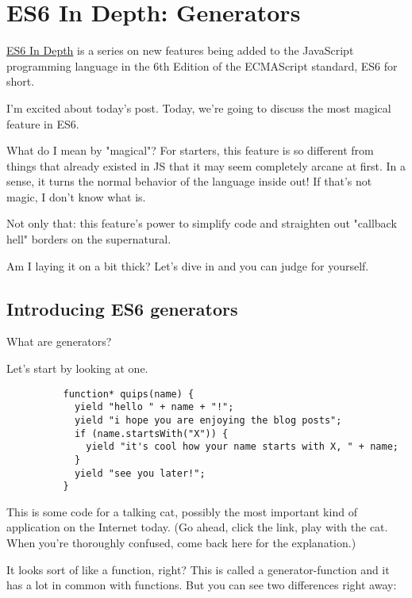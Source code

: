 
\thesistranslationoriginal
\section{ES6 In Depth: Generators}
  \label{sec:es6_in_depth_generators}
    \href{https://hacks.mozilla.org/category/es6-in-depth/}{ES6 In Depth} is a series on new features being added to the JavaScript programming language in the 6th Edition of the ECMAScript standard, ES6 for short.

    I'm excited about today's post. Today, we're going to discuss the most magical feature in ES6.

    What do I mean by "magical"? For starters, this feature is so different from things that already existed in JS that it may seem completely arcane at first. In a sense, it turns the normal behavior of the language inside out! If that's not magic, I don't know what is.

    Not only that: this feature's power to simplify code and straighten out "callback hell" borders on the supernatural.

    Am I laying it on a bit thick? Let's dive in and you can judge for yourself.

    \subsection{Introducing ES6 generators}
      \label{subsec:introducing_es6_generators}
        What are generators?

        Let's start by looking at one.

        \begin{lstlisting}
          function* quips(name) {
            yield "hello " + name + "!";
            yield "i hope you are enjoying the blog posts";
            if (name.startsWith("X")) {
              yield "it's cool how your name starts with X, " + name;
            }
            yield "see you later!";
          }
        \end{lstlisting}

        This is some code for a talking cat, possibly the most important kind of application on the Internet today. (Go ahead, click the link, play with the cat. When you're thoroughly confused, come back here for the explanation.)

        It looks sort of like a function, right? This is called a generator-function and it has a lot in common with functions. But you can see two differences right away:

